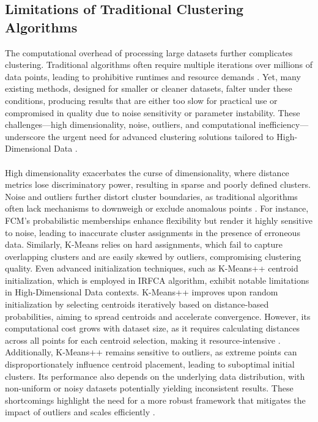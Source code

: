 \documentclass[twoside,11pt]{article}
\renewcommand{\cite}{\citep}
\begin{document}
\subsection{Limitations of Traditional Clustering Algorithms}
The computational overhead of processing large datasets further complicates clustering. Traditional algorithms often require multiple iterations over millions of data points, leading to prohibitive runtimes and resource demands \cite{pitafi2023}. Yet, many existing methods, designed for smaller or cleaner datasets, falter under these conditions, producing results that are either too slow for practical use or compromised in quality due to noise sensitivity or parameter instability. These challenges—high dimensionality, noise, outliers, and computational inefficiency—underscore the urgent need for advanced clustering solutions tailored to High-Dimensional Data \cite{awad2023}.
\\\\
High dimensionality exacerbates the curse of dimensionality, where distance metrics lose discriminatory power, resulting in sparse and poorly defined clusters. Noise and outliers further distort cluster boundaries, as traditional algorithms often lack mechanisms to downweigh or exclude anomalous points \cite{taheri2024}. For instance, FCM’s probabilistic memberships enhance flexibility but render it highly sensitive to noise, leading to inaccurate cluster assignments in the presence of erroneous data. Similarly, K-Means relies on hard assignments, which fail to capture overlapping clusters and are easily skewed by outliers, compromising clustering quality.
Even advanced initialization techniques, such as K-Means++ centroid initialization, which is employed in IRFCA algorithm, exhibit notable limitations in High-Dimensional Data contexts. K-Means++ improves upon random initialization by selecting centroids iteratively based on distance-based probabilities, aiming to spread centroids and accelerate convergence. However, its computational cost grows with dataset size, as it requires calculating distances across all points for each centroid selection, making it resource-intensive \cite{baldassi2022}. Additionally, K-Means++ remains sensitive to outliers, as extreme points can disproportionately influence centroid placement, leading to suboptimal initial clusters. Its performance also depends on the underlying data distribution, with non-uniform or noisy datasets potentially yielding inconsistent results. These shortcomings highlight the need for a more robust framework that mitigates the impact of outliers and scales efficiently \cite{li2018}.
\end{document}
